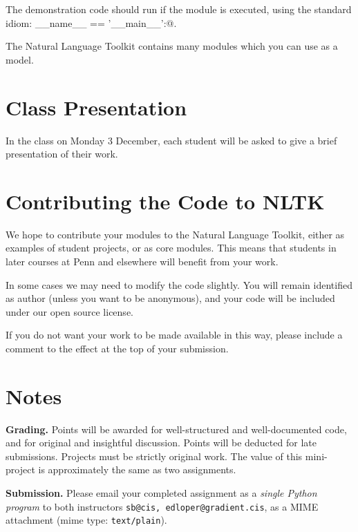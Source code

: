 \documentclass{cis530}
\begin{document}
The demonstration code should run if the module is executed, using the
standard idiom: \verb@if __name__ == '__main__':@.

The Natural Language Toolkit contains many modules which you can use
as a model.

\section{Class Presentation}

In the class on Monday 3 December,
each student will be asked to give a brief presentation
of their work.

\section{Contributing the Code to NLTK}

We hope to contribute your modules to the Natural Language Toolkit,
either as examples of student projects, or as core modules.  This
means that students in later courses at Penn and elsewhere will benefit
from your work.

In some cases we may need to modify the code slightly.  You will
remain identified as author (unless you want to be anonymous), and
your code will be included under our open source license.

If you do not want your work to be made available in this way,
please include a comment to the effect at the top of your submission.

\section*{Notes}

{\bf Grading.}
Points will be awarded for well-structured and well-documented code,
and for original and insightful discussion.
Points will be deducted for late submissions.  Projects must be
strictly original work.  The value of this mini-project is approximately
the same as two assignments.

{\bf Submission.}  
Please email your completed assignment as a
\emph{single Python program} to both instructors
\texttt{sb@cis, edloper@gradient.cis}, as a MIME attachment
(mime type: \texttt{text/plain}).
\vspace{2ex}
\end{document}
